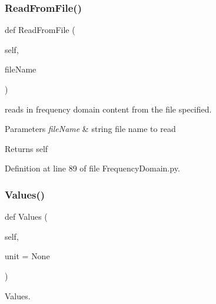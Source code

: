 \subsubsection{\texorpdfstring{Read\+From\+File()}{ReadFromFile()}}
{\footnotesize\ttfamily def Read\+From\+File (\begin{DoxyParamCaption}\item[{}]{self,  }\item[{}]{file\+Name }\end{DoxyParamCaption})}



reads in frequency domain content from the file specified. 


\begin{DoxyParams}{Parameters}
{\em file\+Name} & string file name to read \\
\hline
\end{DoxyParams}
\begin{DoxyReturn}{Returns}
self 
\end{DoxyReturn}


Definition at line 89 of file Frequency\+Domain.\+py.

\mbox{\label{classSignalIntegrity_1_1FrequencyDomain_1_1FrequencyDomain_1_1FrequencyDomain_a3dc7b1e5eba8fb649156094dfdf7a893}} 
\subsubsection{\texorpdfstring{Values()}{Values()}}
{\footnotesize\ttfamily def Values (\begin{DoxyParamCaption}\item[{}]{self,  }\item[{}]{unit = {\ttfamily None} }\end{DoxyParamCaption})}



Values. 


